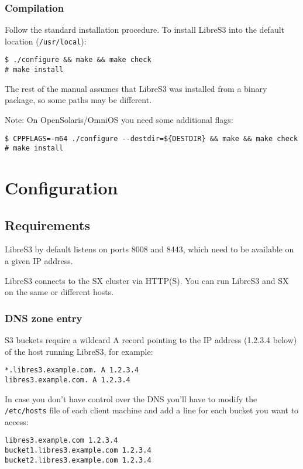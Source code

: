 \newpage
\subsection{Compilation}

Follow the standard installation procedure. To install
LibreS3 into the default location (\verb+/usr/local+):

\begin{lstlisting}
$ ./configure && make && make check
# make install
\end{lstlisting}
The rest of the manual assumes that LibreS3 was installed from a binary
package, so some paths may be different.

Note: On OpenSolaris/OmniOS you need some additional flags:
\begin{lstlisting}
$ CPPFLAGS=-m64 ./configure --destdir=${DESTDIR} && make && make check
# make install
\end{lstlisting}
\chapter{Configuration}

\section{Requirements}

LibreS3 by default listens on ports 8008 and 8443, which need to be available on a given
IP address.

LibreS3 connects to the SX cluster via HTTP(S). You can run LibreS3 and SX
on the same or different hosts.

\subsection{DNS zone entry}

S3 buckets require a wildcard A record pointing to the IP address (1.2.3.4 below) of the
host running LibreS3, for example:

\begin{lstlisting}
*.libres3.example.com. A 1.2.3.4
libres3.example.com. A 1.2.3.4
\end{lstlisting}


In case you don't have control over the DNS you'll have to modify the \verb|/etc/hosts| file
of each client machine and add a line for each bucket you want to access:

\begin{lstlisting}
libres3.example.com 1.2.3.4
bucket1.libres3.example.com 1.2.3.4
bucket2.libres3.example.com 1.2.3.4
\end{lstlisting}


